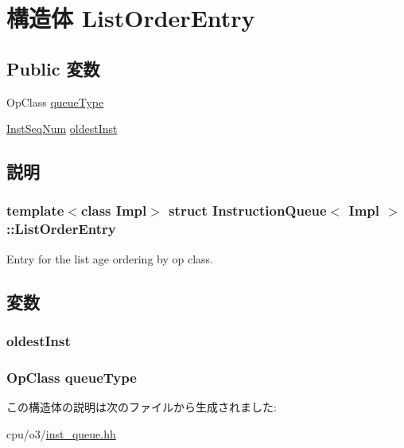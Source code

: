\hypertarget{structInstructionQueue_1_1ListOrderEntry}{
\section{構造体 ListOrderEntry}
\label{structInstructionQueue_1_1ListOrderEntry}
}
\subsection*{Public 変数}
\begin{DoxyCompactItemize}
\item 
OpClass \hyperlink{structInstructionQueue_1_1ListOrderEntry_ab040f34f48e1c1da91a45f403627275e}{queueType}
\item 
\hyperlink{inst__seq_8hh_a258d93d98edaedee089435c19ea2ea2e}{InstSeqNum} \hyperlink{structInstructionQueue_1_1ListOrderEntry_af6279c7c9a940f04a676246e14a4ca75}{oldestInst}
\end{DoxyCompactItemize}


\subsection{説明}
\subsubsection*{template$<$class Impl$>$ struct InstructionQueue$<$ Impl $>$::ListOrderEntry}

Entry for the list age ordering by op class. 

\subsection{変数}
\hypertarget{structInstructionQueue_1_1ListOrderEntry_af6279c7c9a940f04a676246e14a4ca75}{
\subsubsection[{oldestInst}]{ {\bf oldestInst}}}
\label{structInstructionQueue_1_1ListOrderEntry_af6279c7c9a940f04a676246e14a4ca75}
\hypertarget{structInstructionQueue_1_1ListOrderEntry_ab040f34f48e1c1da91a45f403627275e}{
\subsubsection[{queueType}]{\setlength{\rightskip}{0pt plus 5cm}OpClass {\bf queueType}}}
\label{structInstructionQueue_1_1ListOrderEntry_ab040f34f48e1c1da91a45f403627275e}


この構造体の説明は次のファイルから生成されました:\begin{DoxyCompactItemize}
\item 
cpu/o3/\hyperlink{o3_2inst__queue_8hh}{inst\_\-queue.hh}\end{DoxyCompactItemize}

